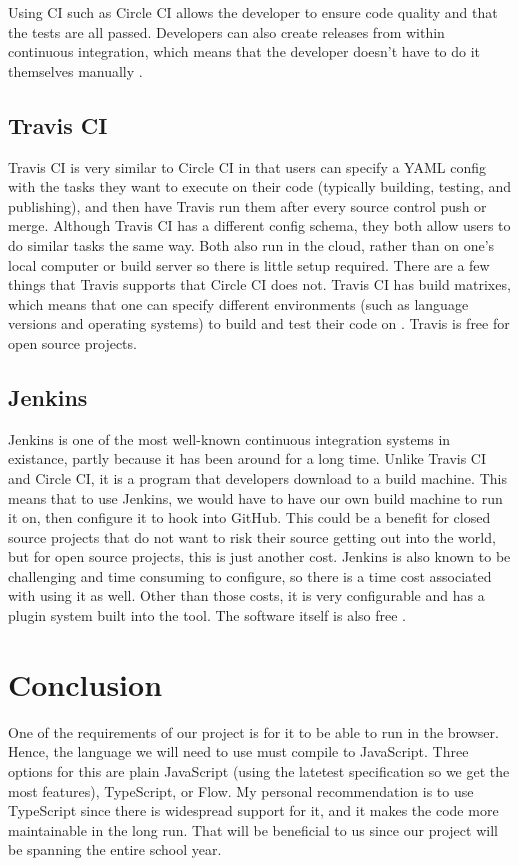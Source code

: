 \documentclass[onecolumn, draftclsnofoot,10pt, compsoc]{IEEEtran}
\begin{document}
Using CI such as Circle CI allows the developer to ensure code quality and that the tests are all passed. Developers can also create releases from within continuous integration, which means that the developer doesn't have to do it themselves manually \cite{ci}.

\subsection{Travis CI}
Travis CI is very similar to Circle CI in that users can specify a YAML config with the tasks they want to execute on their code (typically building, testing, and publishing), and then have Travis run them after every source control push or merge. Although Travis CI has a different config schema, they both allow users to do similar tasks the same way. Both also run in the cloud, rather than on one's local computer or build server so there is little setup required. There are a few things that Travis supports that Circle CI does not. Travis CI has build matrixes, which means that one can specify different environments (such as language versions and operating systems) to build and test their code on \cite{ci}. Travis is free for open source projects.

\subsection{Jenkins}
Jenkins is one of the most well-known continuous integration systems in existance, partly because it has been around for a long time. Unlike Travis CI and Circle CI, it is a program that developers download to a build machine. This means that to use Jenkins, we would have to have our own build machine to run it on, then configure it to hook into GitHub. This could be a benefit for closed source projects that do not want to risk their source getting out into the world, but for open source projects, this is just another cost. Jenkins is also known to be challenging and time consuming to configure, so there is a time cost associated with using it as well. Other than those costs, it is very configurable and has a plugin system built into the tool. The software itself is also free \cite{ci}.

\section{Conclusion}
One of the requirements of our project is for it to be able to run in the browser. Hence, the language we will need to use must compile to JavaScript. Three options for this are plain JavaScript (using the latetest specification so we get the most features), TypeScript, or Flow. My personal recommendation is to use TypeScript since there is widespread support for it, and it makes the code more maintainable in the long run. That will be beneficial to us since our project will be spanning the entire school year.
\end{document}
